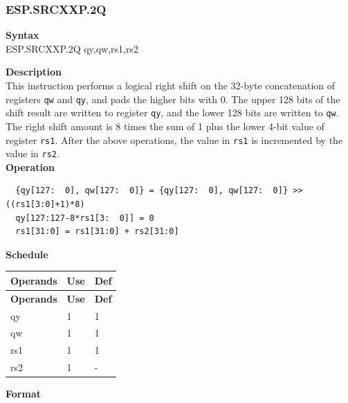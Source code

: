 \newpage
\subsubsection{ESP.SRCXXP.2Q}\label{instruction:ESPSRCXXP2Q}
\textbf{Syntax}\\
ESP.SRCXXP.2Q qy,qw,rs1,rs2

\textbf{Description}\\
This instruction performs a logical right shift on the 32-byte concatenation of registers \lstinline{qw} and \lstinline{qy}, and pads the higher bits with 0. The upper 128 bits of the shift result are written to register \lstinline{qy}, and the lower 128 bits are written to \lstinline{qw}. The right shift amount is 8 times the sum of 1 plus the lower 4-bit value of register \lstinline{rs1}. After the above operations, the value in \lstinline{rs1} is incremented by the value in \lstinline{rs2}.\\
\textbf{Operation}
\begin{lstlisting}
  {qy[127:  0], qw[127:  0]} = {qy[127:  0], qw[127:  0]} >> ((rs1[3:0]+1)*8)
  qy[127:127-8*rs1[3:  0]] = 0
  rs1[31:0] = rs1[31:0] + rs2[31:0]
\end{lstlisting}

\textbf{Schedule}\\
\begin{longtable}[c]{|l|l|l|}
    \hline
    \rowcolor{lightgray}
    \textbf{Operands} & \textbf{Use} & \textbf{Def} \\\hline
    \endfirsthead
    \hline
    \rowcolor{lightgray}
     \textbf{Operands} & \textbf{Use} & \textbf{Def} \\\hline
    \endhead
    \hline
    \endfoot

  qy & 1 & 1 \\\hline
  qw & 1 & 1 \\\hline
  rs1 & 1 & 1 \\\hline
  rs2 & 1 & -

\end{longtable}

\textbf{Format}\\

